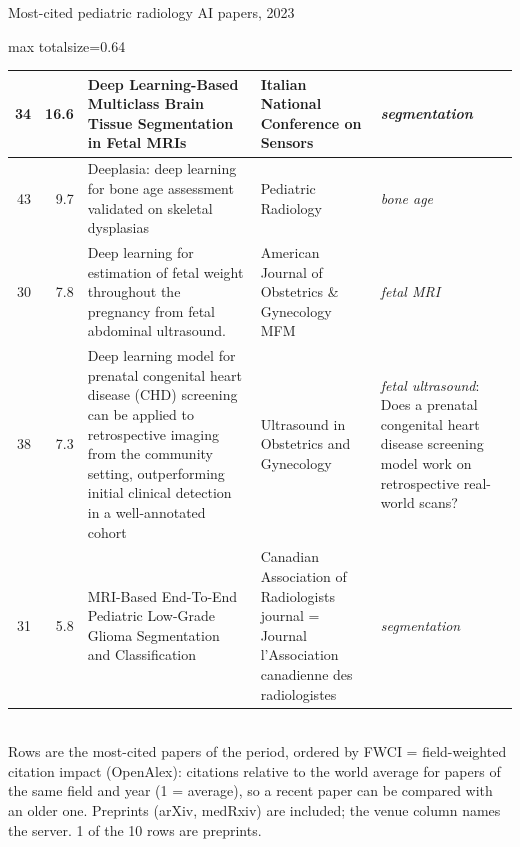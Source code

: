 \documentclass[aspectratio=169]{beamer}
\begin{document}
\begin{frame}[category=Journals/Preprints]{Most-cited pediatric radiology AI papers, 2023}
\begin{adjustbox}{max totalsize={\textwidth}{0.64\textheight}}
\begin{tabular}{|r|r|>{\raggedright\arraybackslash}p{}|>{\raggedright\arraybackslash}p{}|>{\raggedright\arraybackslash}p{}|}
34 & 16.6 & Deep Learning-Based Multiclass Brain Tissue Segmentation in Fetal MRIs & Italian National Conference on Sensors & \textit{segmentation} \\ \hline
43 & 9.7 & Deeplasia: deep learning for bone age assessment validated on skeletal dysplasias & Pediatric Radiology & \textit{bone age} \\ \hline
30 & 7.8 & Deep learning for estimation of fetal weight throughout the pregnancy from fetal abdominal ultrasound. & American Journal of Obstetrics \& Gynecology MFM & \textit{fetal MRI} \\ \hline
38 & 7.3 & Deep learning model for prenatal congenital heart disease (CHD) screening can be applied to retrospective imaging from the community setting, outperforming initial clinical detection in a well-annotated cohort & Ultrasound in Obstetrics and Gynecology & \textit{fetal ultrasound}: Does a prenatal congenital heart disease screening model work on retrospective real-world scans? \\ \hline
31 & 5.8 & MRI-Based End-To-End Pediatric Low-Grade Glioma Segmentation and Classification & Canadian Association of Radiologists journal = Journal l'Association canadienne des radiologistes & \textit{segmentation} \\ \hline
\end{tabular}
\end{adjustbox}
\\[1pt]
{\tiny Rows are the most-cited papers of the period, ordered by FWCI = field-weighted citation impact (OpenAlex): citations relative to the world average for papers of the same field and year (1 = average), so a recent paper can be compared with an older one. Preprints (arXiv, medRxiv) are included; the venue column names the server. 1 of the 10 rows are preprints.}
\end{frame}
\end{document}
